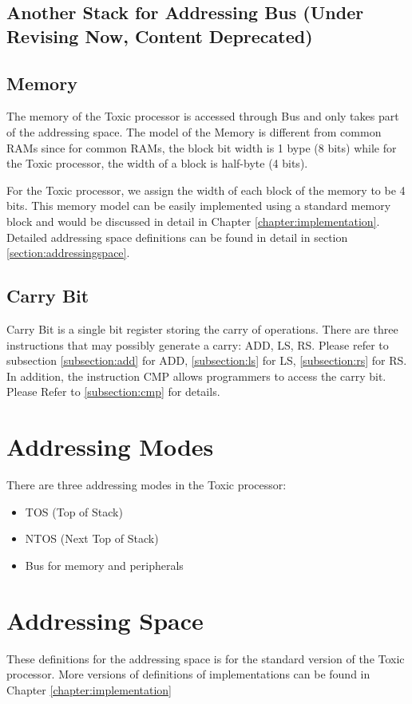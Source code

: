 \documentclass[11pt]{report}
\begin{document}
    \subsection{Another Stack for Addressing Bus (Under Revising Now, Content Deprecated)}
    

    
    \subsection{Memory}
    The memory of the Toxic processor is accessed through Bus and only takes part of the addressing space. 
    The model of the Memory is different from common RAMs since for common RAMs, the block bit width is 1 bype (8 bits)
    while for the Toxic processor, the width of a block is half-byte (4 bits). \par
    For the Toxic processor, we assign the width of each block of the memory to be 4 bits.
    This memory model can be easily implemented using a standard memory block and would be discussed in detail in 
    Chapter \ref{chapter:implementation}.
    Detailed addressing space definitions can be found in detail in section \ref{section:addressingspace}.
    \subsection{Carry Bit}
    Carry Bit is a single bit register storing the carry of operations. There are three instructions that may possibly 
    generate a carry: ADD, LS, RS. Please refer to subsection \ref{subsection:add} for ADD, \ref{subsection:ls} for LS, 
    \ref{subsection:rs} for RS. In addition, the instruction CMP allows programmers to access the carry bit. Please Refer to
    \ref{subsection:cmp} for details.

    \section{Addressing Modes}
    There are three addressing modes in the Toxic processor:
    \begin{itemize}
        \item TOS (Top of Stack)
        \item NTOS (Next Top of Stack)
        \item Bus for memory and peripherals
    \end{itemize}

    \section{Addressing Space}
    These definitions for the addressing space is for the standard version of the Toxic processor.
    More versions of definitions of implementations can be found in Chapter \ref{chapter:implementation}
    \label{section:addressingspace}
\end{document}
